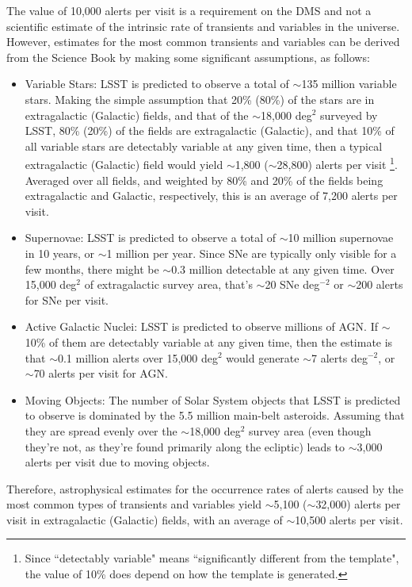 \documentclass[DM,authoryear,toc]{lsstdoc}
\begin{document}
The value of 10,000 alerts per visit is a requirement on the \gls{DMS} and not a scientific estimate of the intrinsic rate of transients and variables in the universe. However, estimates for the most common transients and variables can be derived from the Science Book \citep{2009arXiv0912.0201L} by making some significant assumptions, as follows:
\begin{itemize}
\item Variable Stars: \gls{LSST} is predicted to observe a total of $\sim$135 million variable stars. Making the simple assumption that 20\% (80\%) of the stars are in extragalactic (Galactic) fields, and that of the $\sim$18,000 \gls{deg}$^2$ surveyed by \gls{LSST}, 80\% (20\%) of the fields are extragalactic (Galactic), and that 10\% of all variable stars are detectably variable at any given time, then a typical extragalactic (Galactic) field would yield $\sim$1,800 ($\sim$28,800) alerts per visit \footnote{Since ``detectably variable" means ``significantly different from the template", the value of 10\% does depend on how the template is generated.}. Averaged over all fields, and weighted by 80\% and 20\% of the fields being extragalactic and Galactic, respectively, this is an average of 7,200 alerts per visit.
\item Supernovae: \gls{LSST} is predicted to observe a total of $\sim$10 million supernovae in 10 years, or $\sim$1 million per year. Since SNe are typically only visible for a few months, there might be $\sim$0.3 million detectable at any given time. Over 15,000 \gls{deg}$^{2}$ of extragalactic survey area, that's $\sim$20 SNe \gls{deg}$^{-2}$ or $\sim$200 alerts for SNe per visit.
\item Active Galactic Nuclei: \gls{LSST} is predicted to observe millions of AGN. If $\sim$10\% of them are detectably variable at any given time, then the estimate is that $\sim$0.1 million alerts over 15,000 \gls{deg}$^2$ would generate $\sim$7 alerts \gls{deg}$^{-2}$, or $\sim$70 alerts per visit for AGN.
\item Moving Objects: The number of Solar System objects that \gls{LSST} is predicted to observe is dominated by the 5.5 million main-belt asteroids. Assuming that they are spread evenly over the $\sim$18,000 \gls{deg}$^2$ survey area (even though they're not, as they're found primarily along the ecliptic) leads to $\sim$3,000 alerts per visit due to moving objects.
\end{itemize} 
Therefore, astrophysical estimates for the occurrence rates of alerts caused by the most common types of transients and variables yield $\sim$5,100 ($\sim$32,000) alerts per visit in extragalactic (Galactic) fields, with an average of $\sim$10,500 alerts per visit.
\end{document}
